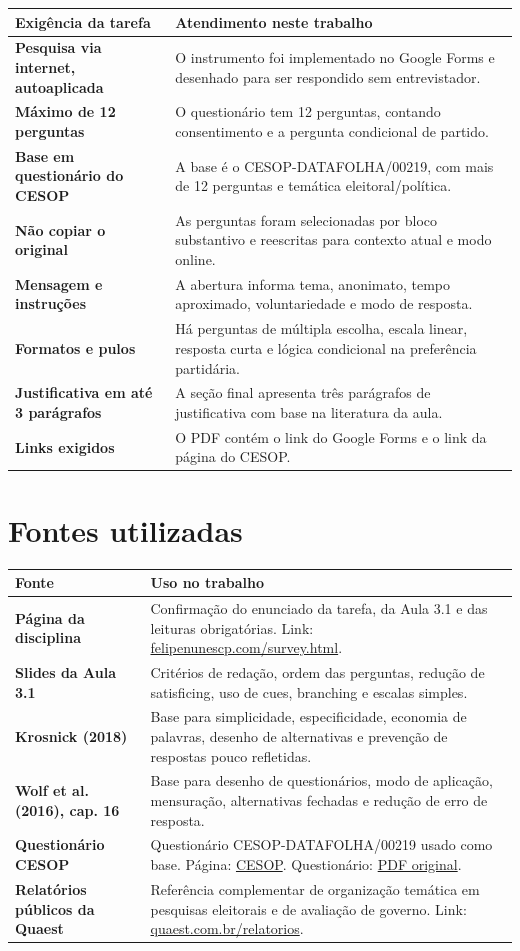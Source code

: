 \documentclass[11pt,a4paper]{article}
\newcommand{\linkcesop}{https://www.cesop.unicamp.br/por/banco_de_dados/v/458}
\newcommand{\linkquestionario}{https://www.cesop.unicamp.br/vw/1IsfxSa4wNQ_MDA_26dd5_/quest_00219.pdf}
\newcommand{\linkdisciplina}{http://www.felipenunescp.com/survey.html}
\newcommand{\linkquaest}{https://quaest.com.br/relatorios/}
\begin{document}
\begin{tabularx}{\textwidth}{>{\bfseries}p{}X}
\toprule
Exigência da tarefa & Atendimento neste trabalho \\
\midrule
Pesquisa via internet, autoaplicada & O instrumento foi implementado no Google Forms e desenhado para ser respondido sem entrevistador. \\
Máximo de 12 perguntas & O questionário tem 12 perguntas, contando consentimento e a pergunta condicional de partido. \\
Base em questionário do CESOP & A base é o CESOP-DATAFOLHA/00219, com mais de 12 perguntas e temática eleitoral/política. \\
Não copiar o original & As perguntas foram selecionadas por bloco substantivo e reescritas para contexto atual e modo online. \\
Mensagem e instruções & A abertura informa tema, anonimato, tempo aproximado, voluntariedade e modo de resposta. \\
Formatos e pulos & Há perguntas de múltipla escolha, escala linear, resposta curta e lógica condicional na preferência partidária. \\
Justificativa em até 3 parágrafos & A seção final apresenta três parágrafos de justificativa com base na literatura da aula. \\
Links exigidos & O PDF contém o link do Google Forms e o link da página do CESOP. \\
\bottomrule
\end{tabularx}

\section*{Fontes utilizadas}

\begin{tabularx}{\textwidth}{>{\bfseries}p{}X}
\toprule
Fonte & Uso no trabalho \\
\midrule
Página da disciplina & Confirmação do enunciado da tarefa, da Aula 3.1 e das leituras obrigatórias. Link: \href{\linkdisciplina}{felipenunescp.com/survey.html}. \\
Slides da Aula 3.1 & Critérios de redação, ordem das perguntas, redução de satisficing, uso de cues, branching e escalas simples. \\
Krosnick (2018) & Base para simplicidade, especificidade, economia de palavras, desenho de alternativas e prevenção de respostas pouco refletidas. \\
Wolf et al. (2016), cap. 16 & Base para desenho de questionários, modo de aplicação, mensuração, alternativas fechadas e redução de erro de resposta. \\
Questionário CESOP & Questionário CESOP-DATAFOLHA/00219 usado como base. Página: \href{\linkcesop}{CESOP}. Questionário: \href{\linkquestionario}{PDF original}. \\
Relatórios públicos da Quaest & Referência complementar de organização temática em pesquisas eleitorais e de avaliação de governo. Link: \href{\linkquaest}{quaest.com.br/relatorios}. \\
\bottomrule
\end{tabularx}
\end{document}
